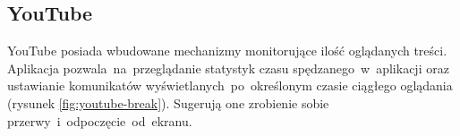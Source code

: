 \bigskip
{}

\subsection{YouTube}
\label{sec:youtube}
YouTube posiada wbudowane mechanizmy monitorujące ilość oglądanych treści. Aplikacja pozwala~na~przeglądanie statystyk czasu spędzanego~w~aplikacji oraz ustawianie komunikatów wyświetlanych~po~określonym czasie ciągłego oglądania (rysunek \ref{fig:youtube-break}). Sugerują one zrobienie sobie przerwy~i~odpoczęcie~od~ekranu.

\bigskip
{}
